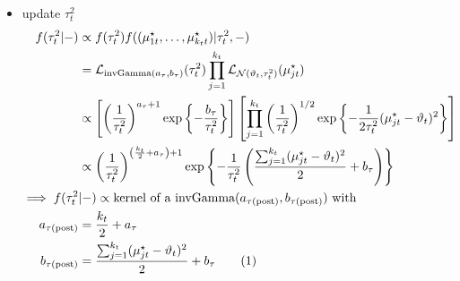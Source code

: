 \documentclass[12pt,	%
	a4paper,		%
	twoside,		%
	openright,		%
	titlepage,%
	]{book}
\theoremstyle{definition}
\begin{document}
\begin{itemize}
\item update $\tau^2_t$
\begin{align*}
f(\tau^2_t|-) & \propto  f(\tau^2_t) f((\mu^\star_{1t},\ldots,\mu^\star_{k_tt})|\tau^2_t,-)\\
& = \law_{\invgamma(a_\tau,b_\tau)}(\tau^2_t)\prod_{j=1}^{k_t} \law_{\N(\theta_t,\tau^2_t)}(\mu^\star_{jt})\\
&\propto \left[\left( \frac{1}{\tau_t^2}\right)^{a_\tau+1} \expp{-\frac{b_\tau}{\tau^2_t}}\right] \left[ \prod_{j=1}^{k_t} \left( \frac{1}{\tau^2_t}\right)^{1/2}\expp{-\frac{1}{2\tau^2_t}(\mu^\star_{jt}-\theta_t)^2}\right]\\
& \propto \left( \frac{1}{\tau^2_t}\right)^{\left( \frac{k_t}{2}+a_\tau\right)+1} \expp{-\frac{1}{\tau^2_t}\left( \frac{\sum_{j=1}^{k_t}(\mu_{jt}^\star-\theta_t)^2}{2}+b_\tau\right)}\\    
\implies f(\tau^2_t&|-)\propto \text{kernel of a $\invgamma(a_{\postp{\tau}}, b_{\postp{\tau}})$ with}\\
a_{\postp{\tau}}&=\frac{k_t}{2}+a_\tau\\
%
b_{\postp{\tau}}&= \frac{\sum_{j=1}^{k_t}(\mu_{jt}^\star-\theta_t)^2}{2}+b_\tau
\tag{\stepcounter{equation}\theequation}
\end{align*}
    


\end{itemize}
\end{document}
